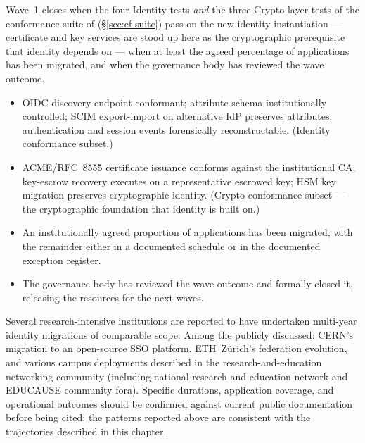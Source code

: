 Wave~1 closes when the four Identity tests \emph{and} the three
Crypto-layer tests of the conformance suite of
 (\S\ref{sec:cf-suite}) pass on the new
identity instantiation --- certificate and key services are stood up
here as the cryptographic prerequisite that identity depends on ---
when at least the agreed
percentage of applications has been migrated, and when the
governance body has reviewed the wave outcome.

\begin{itemize}[leftmargin=1.5em,nosep]
  \item OIDC discovery endpoint conformant; attribute schema
    institutionally controlled; SCIM export-import on alternative
    IdP preserves attributes; authentication and session events
    forensically reconstructable. (Identity conformance subset.)
  \item ACME/RFC~8555 certificate issuance conforms against the
    institutional CA; key-escrow recovery executes on a representative
    escrowed key; HSM key migration preserves cryptographic identity.
    (Crypto conformance subset --- the cryptographic foundation that
    identity is built on.)
  \item An institutionally agreed proportion of applications has been
    migrated, with the remainder either
    in a documented schedule or in the documented exception
    register.
  \item The governance body has reviewed the wave outcome and
    formally closed it, releasing the resources for the next
    waves.
\end{itemize}

\begin{realworldbox}
\noindent Several research-intensive institutions are reported to
have undertaken multi-year identity migrations of comparable scope.
Among the publicly discussed: CERN's migration to an open-source
SSO platform, ETH~Z\"urich's federation evolution, and various
campus
deployments described in the research-and-education networking
community (including national research and education network and
EDUCAUSE community fora).
Specific durations, application coverage, and operational outcomes
should be confirmed against current public documentation before
being cited; the patterns reported above are consistent with the
trajectories described in this chapter.
\end{realworldbox}

